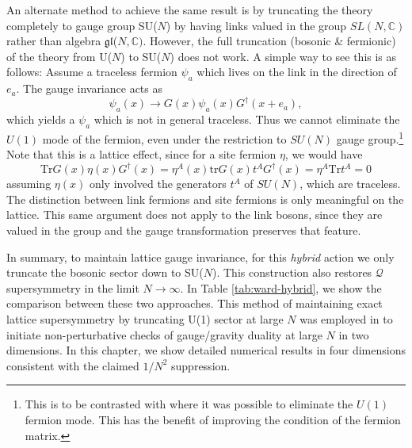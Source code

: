 An alternate method to achieve the same 
result is by truncating the theory completely to gauge group SU($N$) 
by having links valued in the group $SL(N,\mathbb{C})$ rather than algebra $\mathfrak{gl}$($N,\mathbb{C})$. 
However, the full truncation (bosonic \& fermionic) 
of the theory from U($N$) to SU($N$) does not work. A simple way to see this is as follows: 
Assume a traceless fermion $\psi_a$ which lives on the link in the direction of $e_a$. 
The gauge invariance acts as 
\begin{equation}
\psi_a(x) \to G(x) \psi_a(x) G^\dagger(x + e_a),
\end{equation}
which yields a $\psi_a$ which is not in general traceless. 
Thus we cannot eliminate the $U(1)$ mode of the fermion, even
under the restriction to $SU(N)$ gauge group.\footnote{This is
to be contrasted with \cite{Berkowitz:2016jlq,Rinaldi:2017mjl,Berkowitz:2018qhn} where it was possible to eliminate
the $U(1)$ fermion mode.  This has the benefit of improving
the condition of the fermion matrix.}  Note that this is
a lattice effect, since for a site fermion $\eta$, we would have
\begin{equation}
\mathrm{Tr} G(x) \eta(x) G^\dagger(x) = \eta^A(x) \mathrm{tr} G(x) t^A G^\dagger(x) = \eta^A \mathrm{Tr} t^A = 0
\end{equation}
assuming $\eta(x)$ only involved the generators $t^A$ of $SU(N)$, which are traceless.
The distinction between link fermions and site fermions is only meaningful on the lattice.
This same argument does not apply to the link bosons, since they are valued in the group
and the gauge transformation preserves that feature.

In summary, to maintain lattice gauge invariance, for this {\it hybrid} action 
we only truncate the bosonic sector down to SU($N$). 
This construction also restores $\mathcal{Q}$ supersymmetry 
in the limit $N\to\infty$. In Table \ref{tab:ward-hybrid}, we show the comparison between these two approaches. This method of maintaining
exact lattice supersymmetry by truncating U(1) sector at large $N$ was employed in \cite{Catterall:2017lub,Jha:2017zad} 
to initiate non-perturbative checks of gauge/gravity duality at large $N$ in two dimensions. 
In this chapter, we show detailed numerical results in four dimensions consistent with the claimed $1/N^2$ suppression.


